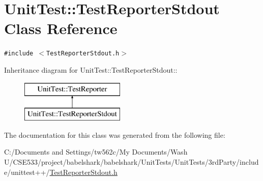 \hypertarget{class_unit_test_1_1_test_reporter_stdout}{
\section{UnitTest::TestReporterStdout Class Reference}
\label{class_unit_test_1_1_test_reporter_stdout}
}
{\tt \#include $<$TestReporterStdout.h$>$}

Inheritance diagram for UnitTest::TestReporterStdout::\begin{figure}[H]
\begin{center}
\leavevmode
\includegraphics[height=2cm]{class_unit_test_1_1_test_reporter_stdout}
\end{center}
\end{figure}


The documentation for this class was generated from the following file:\begin{CompactItemize}
\item 
C:/Documents and Settings/tw562c/My Documents/Wash U/CSE533/project/babelshark/babelshark/UnitTests/UnitTests/3rdParty/include/unittest++/\hyperlink{_test_reporter_stdout_8h}{TestReporterStdout.h}\end{CompactItemize}
